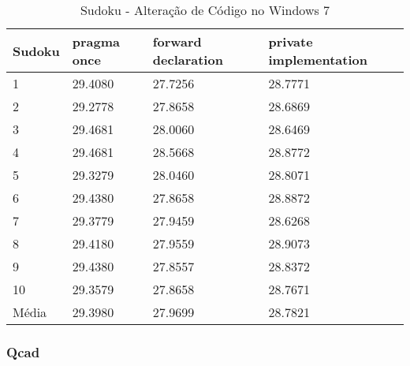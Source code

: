 \begin{table}[!h]
\centering
\caption{Sudoku - Alteração de Código no Windows 7}
\label{tab:alteracao_de_codigo:windows:sudoku}
\begin{tabular}{llll}
\textbf{Sudoku} & \textbf{pragma once} & \textbf{forward declaration} & \textbf{private implementation}   \\ \toprule
1                                    & 29.4080 & 27.7256 & 28.7771  \\ 
2                                    & 29.2778 & 27.8658 & 28.6869  \\ 
3                                    & 29.4681 & 28.0060 & 28.6469  \\ 
4                                    & 29.4681 & 28.5668 & 28.8772  \\ 
5                                    & 29.3279 & 28.0460 & 28.8071  \\ 
6                                    & 29.4380 & 27.8658 & 28.8872  \\ 
7                                    & 29.3779 & 27.9459 & 28.6268  \\ 
8                                    & 29.4180 & 27.9559 & 28.9073  \\ 
9                                    & 29.4380 & 27.8557 & 28.8372  \\ 
10                                   & 29.3579 & 27.8658 & 28.7671  \\ \bottomrule
Média                                & 29.3980 & 27.9699 & 28.7821  \\ 
\end{tabular}
\end{table}

\clearpage
\subsubsection*{Qcad}

